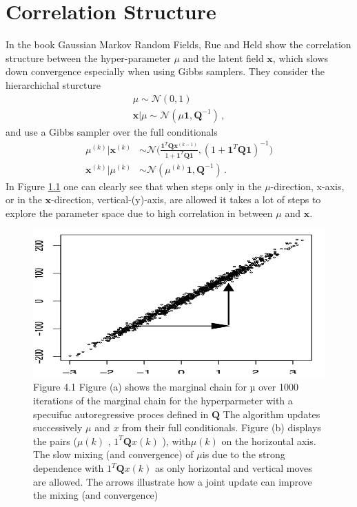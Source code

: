 \chapter{Correlation Structure}
\label{ap:Correlatation}
In the book Gaussian Markov Random Fields, Rue and Held show the correlation structure between the hyper-parameter $\mu$ and the latent field $\bm{x}$, which slows down convergence especially when using Gibbs samplers.
They consider the hierarchichal sturcture
\begin{align}
	\mu \sim \mathcal{N}(0,1)\\
	\bm{x}|\mu \sim \mathcal{N}(\mu\bm{1},\bm{Q}^{-1}) \, ,
\end{align}
and use a Gibbs sampler over the full conditionals
\begin{align}
	\mu^{(k)} | \bm{x}^{(k)} &\sim \mathcal{N} \Bigg(\frac{\bm{1}^T\bm{Q}\bm{x}^{(k-1)}}{1 + \bm{1}^T\bm{Q}\bm{1}}, (1 + \bm{1}^T\bm{Q}\bm{1})^{-1} \Bigg)\\
	\bm{x}^{(k)} | \mu^{(k)} &\sim \mathcal{N} (	\mu^{(k)}\bm{1}, \bm{Q}^{-1}) \, .
\end{align}
In Figure \ref{fig:RueHeld} one can clearly see that when steps only in the $\mu$-direction, x-axis, or in the $\bm{x}$-direction, vertical-(y)-axis, are allowed it takes a lot of steps to explore the parameter space due to high correlation in between $\mu$ and $\bm{x}$.
\begin{figure}[ht!]
	\centering
	\includegraphics[width = \textwidth]{Figures/RueHeldBookFig.png}
	\caption[Correlation structur]{Figure 4.1 Figure (a) shows the marginal chain for µ over 1000 iterations of
		the marginal chain for the hyperparmeter with a specuifuc autoregressive proces defined in $\bm{Q}$ The algorithm
		updates successively $\mu$ and $x$ from their full conditionals. Figure (b) displays
		the pairs ($\mu(k)$ ,  $1^T\bm{Q}x(k)$ ), with$\mu(k)$ on the horizontal axis. The slow mixing
		(and convergence) of $\mu$is due to the strong dependence with $1^T\bm{Q}x(k)$  as only
		horizontal and vertical moves are allowed. The arrows illustrate how a joint
		update can improve the mixing (and convergence)}
	\label{fig:RueHeld}
\end{figure}
